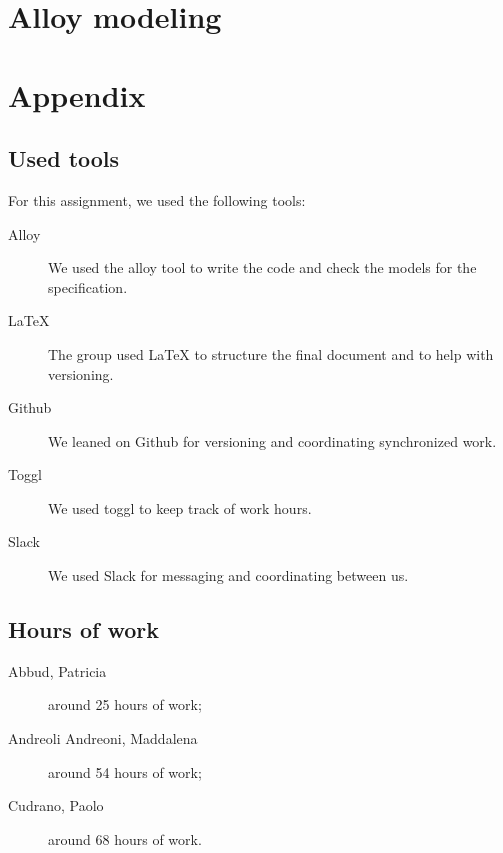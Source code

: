 \documentclass[12pt, a4paper]{article}
\begin{document}
	\newpage
	\section{Alloy modeling}
	

	\newpage
	\section{Appendix}
		\listoffigures
		\listoftables
		
		\subsection{Used tools}
		For this assignment, we used the following tools:
		
		\begin{description}
			\item [Alloy] We used the alloy tool to write the code and check the models for the specification.
			\item [LaTeX] The group used LaTeX to structure the final document and to help with versioning.
			\item [Github] We leaned on Github for versioning and coordinating synchronized work.
			\item [Toggl] We used toggl to keep track of work hours.
			\item [Slack] We used Slack for messaging and coordinating between us.
			
		\end{description}
		
		\subsection{Hours of work}
			\begin{description}
				\item[Abbud, Patricia] around 25 hours of work;
				\item[Andreoli Andreoni, Maddalena] around 54 hours of work;
				\item[Cudrano, Paolo] around 68 hours of work.
			\end{description}
\end{document}
